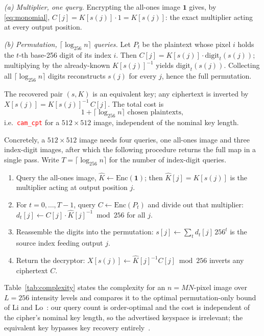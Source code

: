 \documentclass[conference,a4paper]{IEEEtran}
\newcommand{\PH}[1]{\textcolor{red}{\texttt{#1}}}
\begin{document}
\emph{(a) Multiplier, one query.} Encrypting the all-ones image $\mathbf{1}$ gives, by
\eqref{eq:monomial}, $C[j]=K[s(j)]\cdot 1=K[s(j)]$: the exact multiplier acting at every output
position.

\emph{(b) Permutation, $\lceil\log_{256} n\rceil$ queries.} Let $P_t$ be the plaintext whose pixel $i$
holds the $t$-th base-256 digit of its index $i$. Then $C[j]=K[s(j)]\cdot \mathrm{digit}_t(s(j))$;
multiplying by the already-known $K[s(j)]^{-1}$ yields $\mathrm{digit}_t(s(j))$. Collecting all
$\lceil\log_{256} n\rceil$ digits reconstructs $s(j)$ for every $j$, hence the full permutation.

The recovered pair $(s,K)$ is an equivalent key; any ciphertext is inverted by
$X[s(j)] = K[s(j)]^{-1}\,C[j]$. The total cost is
\begin{equation}
1+\big\lceil\log_{256} n\big\rceil \text{ chosen plaintexts},
\end{equation}
i.e.\ \PH{cam_cpt} for a $512\times512$ image, independent of the nominal key length.

Concretely, a $512\times512$ image needs four queries, one all-ones image and three index-digit
images, after which the following procedure returns the full map in a single pass. Write
$T=\lceil\log_{256} n\rceil$ for the number of index-digit queries.

\begin{enumerate}
\setlength{\itemsep}{0pt}
\setlength{\parskip}{0pt}
\item Query the all-ones image, $\hat{K} \gets \mathrm{Enc}(\mathbf{1})$; then $\hat{K}[j]=K[s(j)]$ is
the multiplier acting at output position $j$.
\item For $t=0,\dots,T-1$, query $C \gets \mathrm{Enc}(P_t)$ and divide out that multiplier:
$d_t[j] \gets C[j]\cdot \hat{K}[j]^{-1} \bmod 256$ for all $j$.
\item Reassemble the digits into the permutation: $s[j] \gets \sum_t d_t[j]\,256^{t}$ is the source
index feeding output $j$.
\item Return the decryptor: $X[s(j)] \gets \hat{K}[j]^{-1} C[j] \bmod 256$ inverts any ciphertext $C$.
\end{enumerate}

Table~\ref{tab:complexity} states the complexity for an $n{=}MN$-pixel image over $L{=}256$ intensity
levels and compares it to the optimal permutation-only bound
of Li and Lo~\cite{li2011optimal}: our query count is order-optimal and the cost is independent of the
cipher's nominal key length, so the advertised keyspace is irrelevant; the equivalent key bypasses key
recovery entirely~\cite{Jolfaei2016permutation}.
\end{document}
